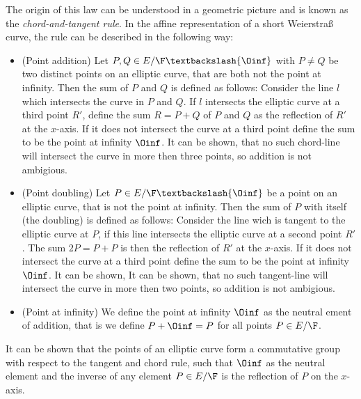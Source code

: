 The origin of this law can be understood in a geometric picture and is known as the \textit{chord-and-tangent rule}. In the affine representation of a short Weierstraß curve, the rule can be described in the following way:
\begin{itemize}
\item (Point addition) Let $P, Q\in E/\F\textbackslash \{\Oinf\}$ with $P\neq Q$ be two distinct points on an elliptic curve, that are both not the point at infinity. Then the sum of $P$ and $Q$ is defined as follows: Consider the line $l$ which intersects the curve in $P$ and $Q$. If $l$ intersects the elliptic curve at a third point $R'$, define the sum $R=P+Q$ of $P$ and $Q$ as the reflection of $R'$ at the $x$-axis. If it does not intersect the curve at a third point define the sum to be the point at infinity $\Oinf$. It can be shown, that no such chord-line will intersect the curve in more then three points, so addition is not ambigious.
\item (Point doubling) Let $P \in E/\F\textbackslash \{\Oinf\}$ be a point on an elliptic curve, that is not the point at infinity. Then the sum of $P$ with itself (the doubling) is defined as follows: Consider the line wich is tangent to the elliptic curve at $P$, if this line intersects the elliptic curve at a second point $R'$. The sum $2P=P+P$ is then the reflection of $R'$ at the $x$-axis. If it does not intersect the curve at a third point define the sum to be the point at infinity $\Oinf$. It can be shown, It can be shown, that no such tangent-line will intersect the curve in more then two points, so addition is not ambigious.
\item (Point at infinity) We define the point at infinity $\Oinf$ as the neutral ement of addition, that is we define $P+\Oinf = P$ for all points $P\in E/\F$.
\end{itemize}
It can be shown that the points of an elliptic curve form a commutative group with respect to the tangent and chord rule, such that $\Oinf$ as the neutral element and the inverse of any element $P\in E/\F$ is the reflection of $P$ on the $x$-axis.


